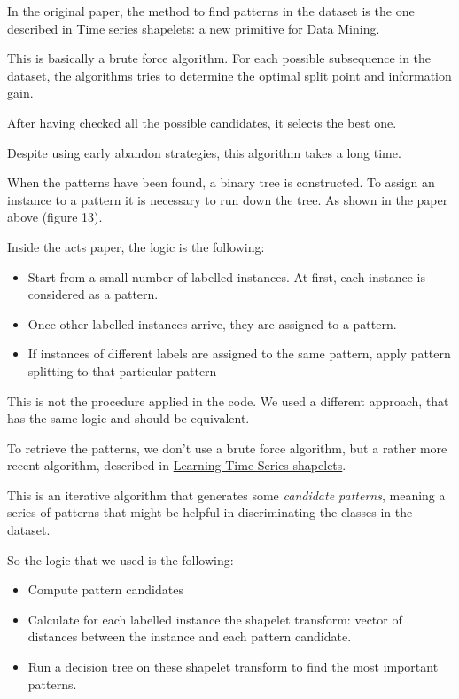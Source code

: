 In the original paper, the method to find patterns in the dataset is the one described in 
\href{https://dl.acm.org/doi/10.1007/s10618-010-0179-5}{Time series shapelets: a new primitive
for Data Mining}. 

This is basically a brute force algorithm. For each possible subsequence in the dataset, 
the algorithms tries to determine the optimal split point and information gain.

After having checked all the possible candidates, it selects the best one.

Despite using early abandon strategies, this algorithm takes a long time.

When the patterns have been found, a binary tree is constructed. To assign an instance to a 
pattern it is necessary to run down the tree. As shown in the paper above (figure 13).

Inside the acts paper, the logic is the following:
\begin{itemize}
    \item Start from a small number of labelled instances. At first, each instance is considered 
    as a pattern.
    \item Once other labelled instances arrive, they are assigned to a pattern.
    \item If instances of different labels are assigned to the same pattern, apply 
    pattern splitting to that particular pattern 
\end{itemize}

This is not the procedure applied in the code. We used a different approach, that has 
the same logic and should be equivalent.

To retrieve the patterns, we don't use a brute force algorithm, but a rather more recent 
algorithm, described in \href{https://www.ismll.uni-hildesheim.de/pub/pdfs/grabocka2014e-kdd.pdf}{Learning
Time Series shapelets}.

This is an iterative algorithm that generates some \textit{candidate patterns}, 
meaning a series of patterns that might be helpful in discriminating the classes in the dataset.

So the logic that we used is the following:
\begin{itemize}
    \item Compute pattern candidates 
    \item Calculate for each labelled instance the shapelet transform: vector of distances between the instance and 
    each pattern candidate.
    \item Run a decision tree on these shapelet transform to find the most important patterns.
\end{itemize}

